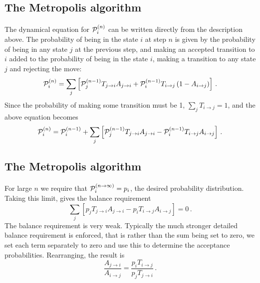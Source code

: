 \documentclass[%
twoside,                 %
final,                   %
10pt]{article}
\begin{document}
\subsection*{The Metropolis algorithm}

\paragraph{}
The dynamical equation for ${\cal P}_i^{(n)}$ can be written directly from
the description above. The probability of being in the state $i$ at step $n$
is given by the probability of being in any state $j$ at the previous step,
and making an accepted transition to $i$ added to the probability of
being in the state $i$, making a transition to any state $j$ and
rejecting the move:
\[
{\cal P}^{(n)}_i = \sum_j \left [
{\cal P}^{(n-1)}_jT_{j\rightarrow i} A_{j\rightarrow i} 
+{\cal P}^{(n-1)}_iT_{i\rightarrow j}\left ( 1- A_{i\rightarrow j} \right)
\right ] \,.
\]
Since the probability of making some transition must be 1,
$\sum_j T_{i\rightarrow j} = 1$, and the above equation becomes
\[
{\cal P}^{(n)}_i = {\cal P}^{(n-1)}_i +
 \sum_j \left [
{\cal P}^{(n-1)}_jT_{j\rightarrow i} A_{j\rightarrow i} 
-{\cal P}^{(n-1)}_iT_{i\rightarrow j}A_{i\rightarrow j}
\right ] \,.
\]




\subsection*{The Metropolis algorithm}

\paragraph{}
For large $n$ we require that ${\cal P}^{(n\rightarrow \infty)}_i = p_i$,
the desired probability distribution. Taking this limit, gives the
balance requirement
\[
 \sum_j \left [
p_jT_{j\rightarrow i} A_{j\rightarrow i}
-p_iT_{i\rightarrow j}A_{i\rightarrow j}
\right ] = 0 \,.
\]
The balance requirement is very weak. Typically the much stronger detailed
balance requirement is enforced, that is rather than the sum being
set to zero, we set each term separately to zero and use this
to determine the acceptance probabilities. Rearranging, the result is
\[
\frac{ A_{j\rightarrow i}}{A_{i\rightarrow j}}
= \frac{p_iT_{i\rightarrow j}}{ p_jT_{j\rightarrow i}} \,.
\]
\end{document}

